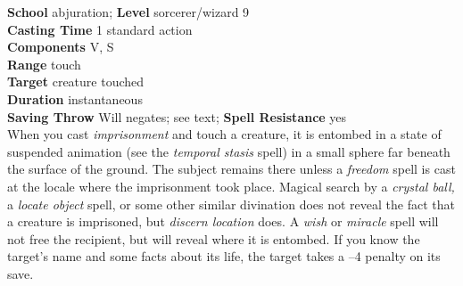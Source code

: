 \textbf{School} abjuration; \textbf{Level} sorcerer/wizard 9\\
\textbf{Casting Time} 1 standard action\\
\textbf{Components} V, S\\
\textbf{Range} touch\\
\textbf{Target} creature touched\\
\textbf{Duration} instantaneous\\
\textbf{Saving Throw }Will negates; see text; \textbf{Spell Resistance} yes\\
When you cast \textit{imprisonment }and touch a creature, it is entombed in a state of suspended animation (see the \textit{temporal stasis }spell) in a small sphere far beneath the surface of the ground. The subject remains there unless a \textit{freedom }spell is cast at the locale where the imprisonment took place. Magical search by a \textit{crystal ball, }a \textit{locate object }spell, or some other similar divination does not reveal the fact that a creature is imprisoned, but \textit{discern location }does. A \textit{wish }or \textit{miracle }spell will not free the recipient, but will reveal where it is entombed. If you know the target's name and some facts about its life, the target takes a --4 penalty on its save.\\
